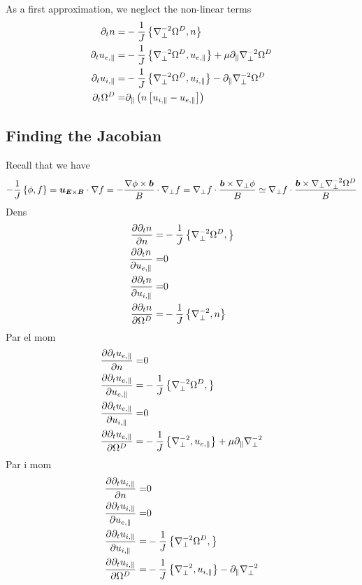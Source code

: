 %
As a first approximation, we neglect the non-linear terms
%
\begin{align*}
 \partial_t n
 =&
 -\frac{1}{J}\L\{\grad_\perp^{-2}\Om^D,n\R\}
\\
%
%
%
\partial_t u_{e,\|}
 =&
 -\frac{1}{J}\L\{\grad_\perp^{-2}\Om^D,u_{e,\|}\R\}
 + \mu \partial_\| \grad_\perp^{-2}\Om^D
\\
%
%
%
\partial_t u_{i,\|}
 =&
 -\frac{1}{J}\L\{\grad_\perp^{-2}\Om^D, u_{i,\|}\R\}
 - \partial_\|\grad_\perp^{-2}\Om^D
\\
%
%
%
  \partial_t \Om^D
  =&
  \partial_\| \L(n\L[ u_{i,\|} - u_{e,\|} \R]\R)
\end{align*}
\subsection{Finding the Jacobian}
%
Recall that we have
%
\begin{align*}
-\frac{1}{J}\left\{\phi,f\right\}
= \boldsymbol{u}_{\boldsymbol{E}\times\boldsymbol{B}}\cdot\nabla f
= -\frac{\nabla\phi\times\boldsymbol{b}}{B}\cdot\nabla_\perp f
= \nabla_\perp f\cdot\frac{\boldsymbol{b}\times\nabla_\perp\phi}{B}
\simeq \nabla_\perp f\cdot\frac{\boldsymbol{b}\times\nabla_\perp\nabla_\perp^{-2}\Omega^D}{B}
\end{align*}
%
Dens
\begin{align*}
 \frac{\partial { \partial_t n }}{\partial{n}} =& -\frac{1}{J}\left\{\nabla_\perp^{-2}\Omega^D,\right\} \\
 \frac{\partial { \partial_t n }}{\partial{u_{e,\|}}} =& 0 \\
 \frac{\partial { \partial_t n }}{\partial{u_{i,\|}}} =& 0 \\
 \frac{\partial { \partial_t n }}{\partial{\Omega^D}} =& -\frac{1}{J}\left\{\nabla_\perp^{-2},n\right\}
\end{align*}
Par el mom
\begin{align*}
    \frac{\partial { \partial_t u_{e,\|} }}{\partial{ n }} =& 0\\
    \frac{\partial { \partial_t u_{e,\|} }}{\partial{u_{e,\|}}} =&
    -\frac{1}{J}\left\{\nabla_\perp^{-2}\Omega^D,\right\}\\
    \frac{\partial { \partial_t u_{e,\|} }}{\partial{ u_{i,\| } }}=& 0\\
    \frac{\partial { \partial_t u_{e,\|} }}{\partial{ \Omega^D }} =&
    -\frac{1}{J}\left\{\nabla_\perp^{-2},u_{e,\|}\right\} + \mu \partial_\|
    \nabla_\perp^{-2}
\end{align*}
Par i mom
\begin{align*}
    \parti{\partial_t u_{i,\|}}{n} =& 0 \\
%
\parti{\partial_t u_{i,\|}}{u_{e,\|}} =& 0\\
%
    \parti{\partial_t u_{i,\|}}{u_{i,\|}} =&
    -\frac{1}{J}\L\{\grad_\perp^{-2}\Om^D,\R\} \\
%
    \parti{\partial_t u_{i,\|}}{\Om^D} =&
    -\frac{1}{J}\L\{\grad_\perp^{-2},u_{i,\|}\R\} -
    \partial_\|\grad_\perp^{-2}
\end{align*}
